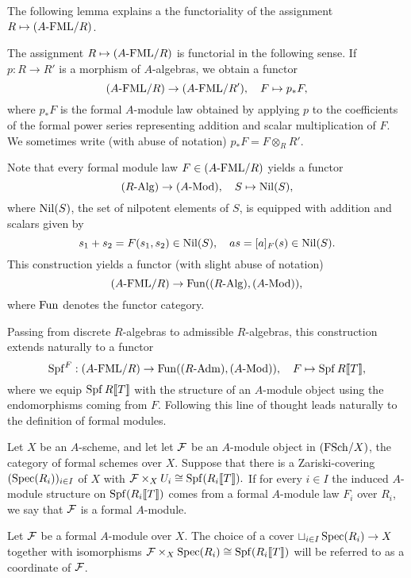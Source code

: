 The following lemma explains a the functoriality of the assignment
$R \mapsto {({A}\text-\mathrm{FML}/{R})}$.

\begin{lem}\label{lem:FMLFunc}
  The assignment $R \mapsto {({A}\text-\mathrm{FML}/{R})}$ is functorial in the following sense.
  If $p: R \to R'$ is a morphism of $A$-algebras, we obtain a functor
  \begin{equation*}
    {({A}\text-\mathrm{FML}/{R})} \to {({A}\text-\mathrm{FML}/{R'})}, \quad F \mapsto p_*F,
  \end{equation*}
  where $p_*F$ is the formal $A$-module law obtained by applying $p$ to the
  coefficients of the formal power series representing addition
  and scalar multiplication of $F$. We sometimes write
  (with abuse of notation) $p_* F = F \otimes_R R'$. 
\end{lem}

Note that every formal module law $F \in {({A}\text-\mathrm{FML}/{R})}$ yields a functor
\begin{equation}\label{eq:fmnilpfunc}
  {({R}\text-\mathrm{Alg})} \to {({A}\text-\mathrm{Mod})}, \quad S \mapsto {\operatorname{Nil}}(S),
\end{equation}
where ${\operatorname{Nil}}(S)$, the set of nilpotent elements of $S$, is equipped with
addition and scalars given by 
\begin{equation*}
  s_1 + s_2 = F(s_1, s_2) \in {\operatorname{Nil}}(S), \quad a s = [a]_F(s) \in {\operatorname{Nil}}(S).
\end{equation*}
This construction yields a functor (with slight abuse of notation)
\begin{equation}\label{eq:formfunc}
  {({A}\text-\mathrm{FML}/{R})} \to \operatorname{Fun}({({R}\text-\mathrm{Alg})}, {({A}\text-\mathrm{Mod})}),
\end{equation}
where $\operatorname{Fun}$ denotes the functor category.

Passing from discrete $R$-algebras to admissible $R$-algebras, this construction extends
naturally to a functor 
\begin{equation*}
  \operatorname{Spf}^F: {({A}\text-\mathrm{FML}/{R})} \to \operatorname{Fun} ({({R}\text-\mathrm{Adm})}, {({A}\text-\mathrm{Mod})}), \quad F \mapsto \operatorname{Spf} R\llbracket T \rrbracket,
\end{equation*}
where we equip $\operatorname{Spf} R \llbracket T \rrbracket$ with the structure of an $A$-module object
using the endomorphisms coming from $F$. 
Following this line of thought leads naturally to the definition of
formal modules. 

\begin{defi}
  Let $X$ be an $A$-scheme, and let 
  let $\mathcal{F}$ be an $A$-module object in ${(\mathrm{FSch}/{X})}$, the category of formal
  schemes over $X$. Suppose that there is a Zariski-covering
  $(\operatorname{Spec}(R_i))_{i \in I}$ of $X$ with $\mathcal{F} \times_{X} U_i \cong
  \operatorname{Spf}(R_i\llbracket T \rrbracket).$ If for every $i\in I$ the induced $A$-module
  structure on $\operatorname{Spf}(R_i\llbracket T \rrbracket)$ comes from a formal $A$-module law
  $F_i$ over $R_i$, we say that $\mathcal{F}$ is a formal $A$-module. 
\end{defi}
\begin{defi}[Coordinate]
  Let $\mathcal{F}$ be a formal $A$-module over $X$. The choice of a cover $\sqcup_{i
  \in I} \operatorname{Spec}(R_i) \to X$ together with isomorphisms $\mathcal{F} \times_X \operatorname{Spec}(R_i)
  \cong \operatorname{Spf}(R_i\llbracket T \rrbracket)$ will be referred to as a coordinate of $\mathcal{F}$. 
\end{defi}

